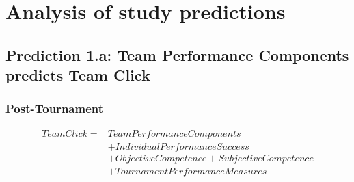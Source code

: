{ \section{Analysis of study predictions\label{app8:analysisPredictions}}




 \subsection{Prediction 1.a: Team Performance Components predicts Team Click}


 \subsubsection{Post-Tournament}

 \begin{equation}
   \begin{align*}
     Team Click =  & Team Performance Components\\
               & + Individual Performance Success \\
               & + Objective Competence + Subjective Competence\\
               & + TournamentPerformanceMeasures \\
   \end{align*}
 \end{equation}
 \bigskip


 



}
